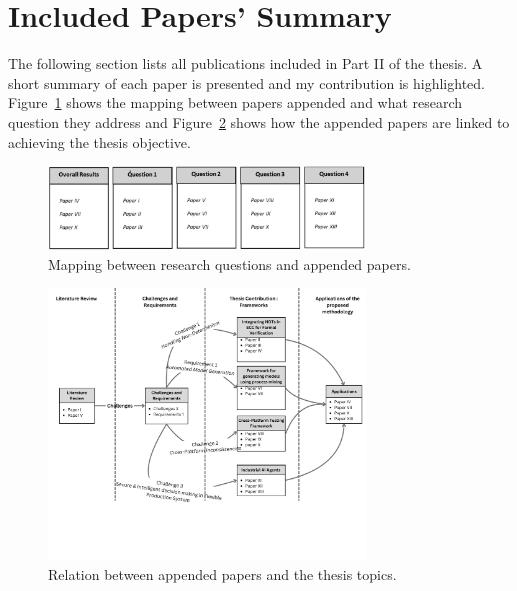 \section{Included Papers' Summary}
The following section lists all publications included in Part II of the thesis. A short summary of each paper is presented and my contribution is highlighted. Figure~\ref{fig:ch1:research_mapping} shows the mapping between papers appended and what research question they address and Figure~\ref{fig:ch1:paper_relationship} shows how the appended papers are linked to achieving the thesis objective.

\begin{figure}[H]
    \centering
    \includegraphics[width=0.75\textwidth]{chapters/images/chapter1/relationship_papers_researchquestions.png}
    \caption{Mapping between research questions and appended papers.}
    \label{fig:ch1:research_mapping}
\end{figure}

\begin{figure}[H]
    \centering
    \includegraphics[width=0.75\textwidth]{chapters/images/chapter1/Literature Review.png}
    \caption{Relation between appended papers and the thesis topics.}
    \label{fig:ch1:paper_relationship}
\end{figure}

